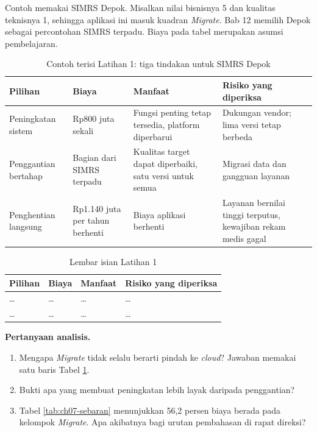 Contoh memakai SIMRS Depok. Misalkan nilai bisnisnya 5 dan kualitas teknisnya 1, sehingga aplikasi ini masuk kuadran \textit{Migrate}. Bab 12 memilih Depok sebagai percontohan SIMRS terpadu. Biaya
pada tabel merupakan asumsi pembelajaran.

\begin{table}[!htb]
  \centering
  \caption{Contoh terisi Latihan 1: tiga tindakan untuk SIMRS Depok}
  \label{tab:ch07-lat1-contoh}
  \small
  \begin{tabularx}{\textwidth}{>{\raggedright\arraybackslash}p{2.4cm}>{\raggedright\arraybackslash}p{2.3cm}>{\raggedright\arraybackslash}X>{\raggedright\arraybackslash}X}
    \hline
    \textbf{Pilihan} & \textbf{Biaya} & \textbf{Manfaat} & \textbf{Risiko yang diperiksa} \\
    \hline
    Peningkatan sistem & Rp800 juta sekali & Fungsi penting tetap tersedia, platform diperbarui & Dukungan vendor; lima versi tetap berbeda \\
    \hline
    Penggantian bertahap & Bagian dari SIMRS terpadu & Kualitas target dapat diperbaiki, satu versi untuk semua & Migrasi data dan gangguan layanan \\
    \hline
    Penghentian langsung & Rp1.140 juta per tahun berhenti & Biaya aplikasi berhenti & Layanan bernilai tinggi terputus, kewajiban rekam medis gagal \\
    \hline
  \end{tabularx}
\end{table}

\begin{table}[!htb]
  \centering
  \caption{Lembar isian Latihan 1}
  \label{tab:ch07-lat1-hasil}
  \small
  \begin{tabularx}{\textwidth}{>{\raggedright\arraybackslash}p{2.4cm}>{\raggedright\arraybackslash}p{2.3cm}>{\raggedright\arraybackslash}X>{\raggedright\arraybackslash}X}
    \hline
    \textbf{Pilihan} & \textbf{Biaya} & \textbf{Manfaat} & \textbf{Risiko yang diperiksa} \\
    \hline
    \dots & \dots & \dots & \dots \\
    \hline
    \dots & \dots & \dots & \dots \\
    \hline
  \end{tabularx}
\end{table}

\textbf{Pertanyaan analisis.}

\begin{enumerate}
  \item Mengapa \textit{Migrate} tidak selalu berarti pindah ke \textit{cloud}? Jawaban memakai satu baris Tabel \ref{tab:ch07-lat1-contoh}.
  \item Bukti apa yang membuat peningkatan lebih layak daripada penggantian?
  \item Tabel \ref{tab:ch07-sebaran} menunjukkan 56,2 persen biaya berada pada kelompok \textit{Migrate}. Apa akibatnya bagi urutan pembahasan di rapat direksi?
\end{enumerate}

